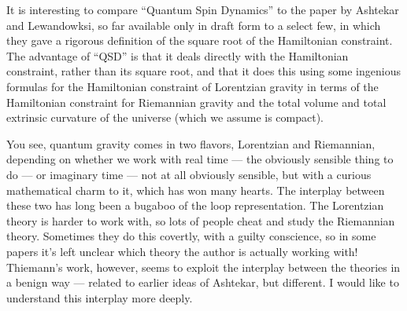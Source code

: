 \documentclass{article}
\renewcommand{\texttt}[1]{%
  \begingroup
  \ttfamily
  \begingroup\lccode`~=`/\lowercase{\endgroup\def~}{/\discretionary{}{}{}}%
  \begingroup\lccode`~=`[\lowercase{\endgroup\def~}{[\discretionary{}{}{}}%
  \begingroup\lccode`~=`.\lowercase{\endgroup\def~}{.\discretionary{}{}{}}%
  \catcode`/=\active\catcode`[=\active\catcode`.=\active
  \scantokens{#1\noexpand}%
  \endgroup
}
\begin{document}
\begin{itemize}

  It is interesting to compare ``Quantum Spin Dynamics'' to the paper by
  Ashtekar and Lewandowksi, so far available only in draft form to a
  select few, in which they gave a rigorous definition of the square
  root of the Hamiltonian constraint. The advantage of ``QSD'' is that
  it deals directly with the Hamiltonian constraint, rather than its
  square root, and that it does this using some ingenious formulas for
  the Hamiltonian constraint of Lorentzian gravity in terms of the
  Hamiltonian constraint for Riemannian gravity and the total volume and
  total extrinsic curvature of the universe (which we assume is
  compact).

  You see, quantum gravity comes in two flavors, Lorentzian and
  Riemannian, depending on whether we work with real time --- the
  obviously sensible thing to do --- or imaginary time --- not at all
  obviously sensible, but with a curious mathematical charm to it, which
  has won many hearts. The interplay between these two has long been a
  bugaboo of the loop representation. The Lorentzian theory is harder to
  work with, so lots of people cheat and study the Riemannian theory.
  Sometimes they do this covertly, with a guilty conscience, so in some
  papers it's left unclear which theory the author is actually working
  with! Thiemann's work, however, seems to exploit the interplay between
  the theories in a benign way --- related to earlier ideas of Ashtekar,
  but different. I would like to understand this interplay more deeply.


\end{itemize}
\end{document}
